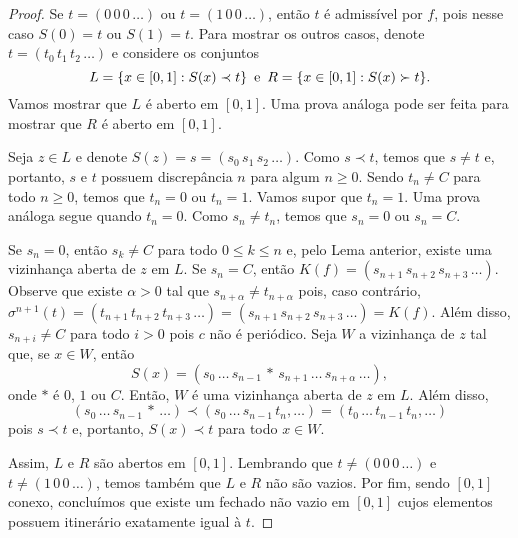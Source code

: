 \begin{proof}
Se $t = (0\, 0\, 0\, \dots)$ ou $t = (1\, 0\, 0\, \dots)$, então $t$ é admissível por $f$, pois nesse caso $S(0) = t$ ou $S(1) = t$. Para mostrar os outros casos, denote $t = (t_0\, t_1\, t_2\, \dots)$ e considere os conjuntos 
$$L = \{ x \in [0, 1] : S(x) \prec t \} \text{\, e \,} R = \{ x \in [0, 1] : S(x) \succ t \}.$$
Vamos mostrar que $L$ é aberto em $[0, 1]$. Uma prova análoga pode ser feita para mostrar que $R$ é aberto em $[0, 1]$.

Seja $z \in L$ e denote $S(z) = s = (s_0 \, s_1 \, s_2 \, \dots)$. Como $s \prec t$, temos que $s \neq t$ e, portanto, $s$ e $t$ possuem discrepância $n$ para algum $n \geq 0$. Sendo $t_n \neq C$ para todo $n \geq 0$, temos que $t_n = 0$ ou $t_n = 1$. Vamos supor que $t_n = 1$. Uma prova análoga segue quando $t_n = 0$. Como $s_n \neq t_n$, temos que $s_n = 0$ ou $s_n = C$. 

Se $s_n = 0$, então $s_k \neq C$ para todo $0 \leq k \leq n$ e, pelo Lema anterior, existe uma vizinhança aberta de $z$ em $L$. Se $s_n = C$, então $K(f) = (s_{n+1}\, s_{n+2}\, s_{n+3}\, \dots)$. Observe que existe $\alpha > 0$ tal que $s_{n+\alpha} \neq t_{n+\alpha}$ pois, caso contrário, $\sigma^{n+1}(t) = (t_{n+1}\, t_{n+2}\, t_{n+3}\, \dots) = (s_{n+1}\, s_{n+2}\, s_{n+3}\, \dots) = K(f)$. Além disso, $s_{n+i} \neq C$ para todo $i > 0$ pois $c$ não é periódico. Seja $W$ a vizinhança de $z$ tal que, se $x \in W$, então
$$S(x) = (s_0\, \dots\, s_{n-1}\, *\, s_{n+1}\, \dots\, s_{n+\alpha}\, \dots),$$
onde $*$ é $0$, $1$ ou $C$. Então, $W$ é uma vizinhança aberta de $z$ em $L$. Além disso,
$$(s_0\, \dots\, s_{n-1}\, *\, \dots) \prec (s_0\, \dots\, s_{n-1}\, t_n, \dots) = (t_0\, \dots\, t_{n-1}\, t_n, \dots)$$
pois $s \prec t$ e, portanto, $S(x) \prec t$ para todo $x \in W$.

Assim, $L$ e $R$ são abertos em $[0, 1]$. Lembrando que $t \neq (0\, 0\, 0\, \dots)$ e $t \neq (1\, 0\, 0\, \dots)$, temos também que $L$ e $R$ não são vazios. Por fim, sendo $[0, 1]$ conexo, concluímos que existe um fechado não vazio em $[0, 1]$ cujos elementos possuem itinerário exatamente igual à $t$.
\end{proof}












